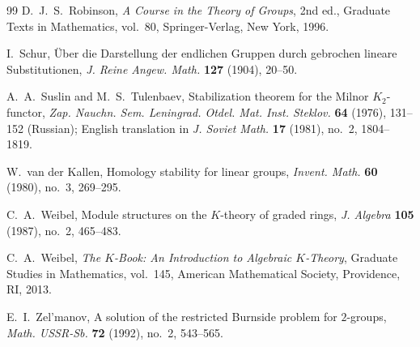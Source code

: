 \begin{thebibliography}{99}
D.~J.~S.~Robinson,
\emph{A Course in the Theory of Groups}, 2nd ed.,
Graduate Texts in Mathematics, vol.~80,
Springer-Verlag, New York, 1996.

I.~Schur,
\"Uber die Darstellung der endlichen Gruppen durch gebrochen lineare
Substitutionen,
\emph{J. Reine Angew. Math.} \textbf{127} (1904), 20--50.

A.~A.~Suslin and M.~S.~Tulenbaev,
Stabilization theorem for the Milnor $K_2$-functor,
\emph{Zap. Nauchn. Sem. Leningrad. Otdel. Mat. Inst. Steklov.}
\textbf{64} (1976), 131--152 (Russian);
English translation in \emph{J. Soviet Math.} \textbf{17} (1981),
no.~2, 1804--1819.

W.~van der Kallen,
Homology stability for linear groups,
\emph{Invent. Math.} \textbf{60} (1980), no.~3, 269--295.

C.~A.~Weibel,
Module structures on the $K$-theory of graded rings,
\emph{J. Algebra} \textbf{105} (1987), no.~2, 465--483.

C.~A.~Weibel,
\emph{The $K$-Book: An Introduction to Algebraic $K$-Theory},
Graduate Studies in Mathematics, vol.~145,
American Mathematical Society, Providence, RI, 2013.

E.~I.~Zel'manov,
A solution of the restricted Burnside problem for $2$-groups,
\emph{Math. USSR-Sb.} \textbf{72} (1992), no.~2, 543--565.

\end{thebibliography}
